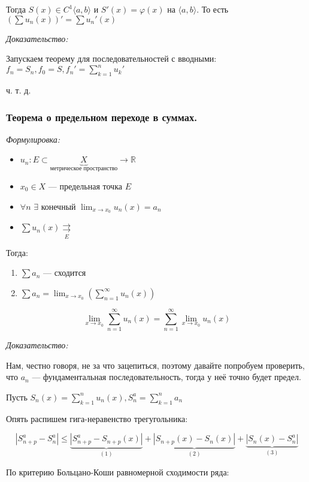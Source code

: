 \documentclass{article}
\def\dbl{\,\,}
\def\rsh#1{\underset{#1}{\rightrightarrows}}
\def\rshe{\rsh{E}}
\begin{document}
Тогда $S(x) \in C^1\langle a, b \rangle$ и $S'(x) = \varphi (x)$ на $\langle a, b \rangle$. То есть $\left(\sum u_n(x)\right)' = \sum u_n'(x)$

\textit{Доказательство:}

Запускаем теорему для последовательностей с вводными: $f_n = S_n, f_0 = S, f_n' = \sum_{k = 1}^n u_k'$

ч. т. д.

\subsubsection{Теорема о предельном переходе в суммах.}
\textit{Формулировка:}

\begin{itemize}
    \item $u_n: E \subset \underbrace{X}_{\text{метрическое пространство}} \rightarrow \mathbb{R}$
    \item $x_0 \in X$ --- предельная точка $E$
    \item $\forall n \dbl \exists$ конечный $\lim_{x \rightarrow x_0} u_n(x) = a_n$
    \item $\sum u_n(x) \rshe$
\end{itemize}

Тогда:

\begin{enumerate}
    \item $\sum a_n$ --- сходится
    \item $\sum a_n = \lim_{x \rightarrow x_0} \left(\sum_{n = 1}^{\infty} u_n(x) \right)$
\end{enumerate}

\[\lim_{x \rightarrow x_0} \sum_{n = 1}^{\infty} u_n(x) = \sum_{n = 1}^{\infty} \lim_{x \rightarrow x_0} u_n(x)\]

\textit{Доказательство:}

Нам, честно говоря, не за что зацепиться, поэтому давайте попробуем проверить, что $a_n$ --- фундаментальная последовательность, тогда у неё точно будет предел.

Пусть $S_n(x) = \sum_{k = 1}^n u_n(x), S^a_n = \sum_{k = 1}^n a_n$

Опять распишем гига-неравенство трегугольника: 

\[|S^a_{n + p} - S^a_n| \le \underbrace{|S^a_{n + p} - S_{n + p}(x)|}_{(1)} + \underbrace{|S_{n + p}(x) - S_n(x)|}_{(2)} + \underbrace{|S_n(x) - S^a_n|}_{(3)}\]

По критерию Больцано-Коши равномерной сходимости ряда:
\end{document}
